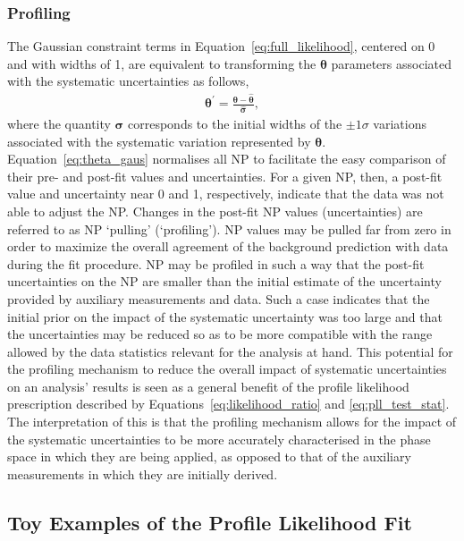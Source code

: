 \subsubsection{Profiling}
\label{sec:profiling}

The Gaussian constraint terms in Equation~\ref{eq:full_likelihood}, centered on 0 and with widths of 1,
are equivalent to transforming the $\bm{\theta}$ parameters associated with the systematic uncertainties as follows,
\begin{align}
    \bm{\theta}^{\prime} = \frac{\bm{\theta} - \bm{\hat{\theta}}}{\bm{\hat{\sigma}}},
    \label{eq:theta_gaus}
\end{align}
where the quantity $\bm{\sigma}$ corresponds to the initial widths of the $\pm 1 \sigma$ variations
associated with the systematic variation represented by $\bm{\theta}$.
Equation~\ref{eq:theta_gaus} normalises all NP to facilitate the easy comparison of their pre- and post-fit values and uncertainties.
For a given NP, then, a post-fit value and uncertainty near 0 and 1, respectively, indicate
that the data was not able to adjust the NP.
Changes in the post-fit NP values (uncertainties) are referred to as NP `pulling' (`profiling').
NP values may be pulled far from zero in order to maximize the overall agreement of the background prediction
with data during the fit procedure.
NP may be profiled in such a way that the post-fit uncertainties on the NP are smaller than
the initial estimate of the uncertainty provided by auxiliary measurements and data.
Such a case indicates that the initial prior on the impact of the systematic uncertainty was too
large and that the uncertainties may be reduced so as to be more compatible  with the range allowed by
the data statistics relevant for the analysis at hand.
This potential for the profiling mechanism to reduce the overall impact of systematic uncertainties
on an analysis' results is seen as a general benefit of the profile likelihood prescription described
by Equations~\ref{eq:likelihood_ratio} and \ref{eq:pll_test_stat}.
The interpretation of this is that the profiling mechanism allows for the impact of the systematic uncertainties
to be more accurately characterised in the phase space in which they are being applied, as opposed
to that of the auxiliary measurements in which they are initially derived.


\subsection{Toy Examples of the Profile Likelihood Fit}
\label{sec:profile_examples}

